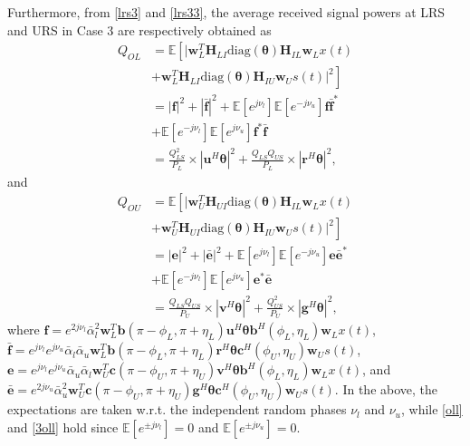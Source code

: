 \documentclass[10pt,final,doublecolumn]{IEEEtran}
\begin{document}
Furthermore, from \eqref{lrs3} and \eqref{lrs33}, the average received signal powers at LRS and URS in Case 3 are respectively obtained as
\begin{align}
{Q}_{OL}&=\mathbb{E}\left[|\mathbf{w}_{{L}}^T\mathbf{H}_{LI}
\text{diag}(\boldsymbol{\theta})\mathbf{H}_{IL}\mathbf{w}_{{L}}x(t)\right.\nonumber\\
&\left.+\mathbf{w}_{{L}}^T\mathbf{H}_{LI}\text{diag}(\boldsymbol{\theta})\mathbf{H}_{IU}
\mathbf{w}_{{U}}s(t)|^2\right]\\
&={|\mathbf{f}|^2}
+{|\bar{\mathbf{f}}|^2} +\mathbb{E}[e^{j\nu_l}]\mathbb{E}[e^{-j\nu_u}]\mathbf{f}\bar{\mathbf{f}}^*
\nonumber\\
&+\mathbb{E}[e^{-j\nu_l}]\mathbb{E}[e^{j\nu_u}]\mathbf{f}^*\bar{\mathbf{f}}
\label{oll}\\
&={\frac{Q_{LS}^2}{P_L}\times|{\mathbf{u}}^H
\boldsymbol{\theta}|^2}+{\frac{Q_{LS}Q_{US}}{P_L}\times|{\mathbf{r}}^H
\boldsymbol{\theta}|^2},\label{qOL}
\end{align}
and
\begin{align}
{Q}_{OU}&=\mathbb{E}\left[|\mathbf{w}_{{U}}^T\mathbf{H}_{UI}\text{diag}(\boldsymbol{\theta})\mathbf{H}_{IL}
\mathbf{w}_{{L}}x(t)\right.\nonumber\\
&\left.+\mathbf{w}_{{U}}^T\mathbf{H}_{UI}
\text{diag}(\boldsymbol{\theta})\mathbf{H}_{IU}\mathbf{w}_{{U}}s(t)|^2\right]\\
&={|\mathbf{e}|^2}
+{|\bar{\mathbf{e}}|^2} +\mathbb{E}[e^{j\nu_l}]\mathbb{E}[e^{-j\nu_u}]\mathbf{e}\bar{\mathbf{e}}^*
\nonumber\\
&+\mathbb{E}[e^{-j\nu_l}]\mathbb{E}[e^{j\nu_u}]\mathbf{e}^*\bar{\mathbf{e}} \label{3oll}\\
&={\frac{Q_{LS}Q_{US}}{P_U}\times|{\mathbf{v}}^H
\boldsymbol{\theta}|^2}+{\frac{Q_{US}^2}{P_U}\times|{\mathbf{g}}^H
\boldsymbol{\theta}|^2},\label{3qOL}
\end{align}
where $\mathbf{f}=e^{2j\nu_l}\bar{\alpha}_l^2\mathbf{w}_{{L}}^T
\mathbf{b}(\pi-{\phi}_{{L}},\pi+{\eta}_{{L}})
{\mathbf{u}}^H
\boldsymbol{\theta}
\mathbf{b}^H({\phi}_{{L}},{\eta}_{{L}})\mathbf{w}_{{L}}x(t)$, $\bar{\mathbf{f}}=e^{j\nu_l}e^{j\nu_u}\bar{\alpha}_l\bar{\alpha}_u\mathbf{w}_{{L}}^T\mathbf{b}
(\pi-{\phi}_{{L}},\pi+{\eta}_{{L}}){\mathbf{r}}^H
\boldsymbol{\theta} \mathbf{c}^H
({\phi}_{{U}},{\eta}_{{U}})
\mathbf{w}_{{U}}s(t)$, $\mathbf{e}=e^{j\nu_l}e^{j\nu_u}\bar{\alpha}_u\bar{\alpha}_l\mathbf{w}_{{U}}^T
\mathbf{c}(\pi-{\phi}_{{U}},\pi+{\eta}_{{U}}){\mathbf{v}}^H
\boldsymbol{\theta}\mathbf{b}^H({\phi}_{{L}},{\eta}_{{L}})
\mathbf{w}_{{L}}x(t)$, and $\bar{\mathbf{e}}=e^{2j\nu_u}\bar{\alpha}_u^2\mathbf{w}_{{U}}^T
\mathbf{c}(\pi-{\phi}_{{U}},\pi+{\eta}_{{U}}){\mathbf{g}}^H
\boldsymbol{\theta}
\mathbf{c}^H({\phi}_{{U}},{\eta}_{{U}})\mathbf{w}_{{U}}s(t)$.
In the above, the expectations are taken w.r.t. the independent random phases  $\nu_l$ and $\nu_u$, while \eqref{oll} and \eqref{3oll} hold since $\mathbb{E}[e^{\pm j\nu_l}]=0$ and $\mathbb{E}[e^{\pm j\nu_u}]=0$.
\end{document}
